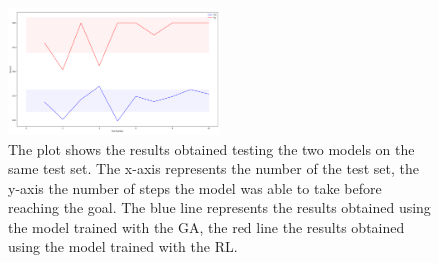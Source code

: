 \begin{figure}[H]
	\centering
	\includegraphics [width=0.5\textwidth]{Images/GAvRL_backup.png}
	\caption{The plot shows the results obtained testing the two models on the same test set. The x-axis represents the number of the test set, the y-axis the number of steps the model was able to take before reaching the goal. The blue line represents the results obtained using the model trained with the GA, the red line the results obtained using the model trained with the RL.}
	\label{figRLvsGA}
\end{figure}



